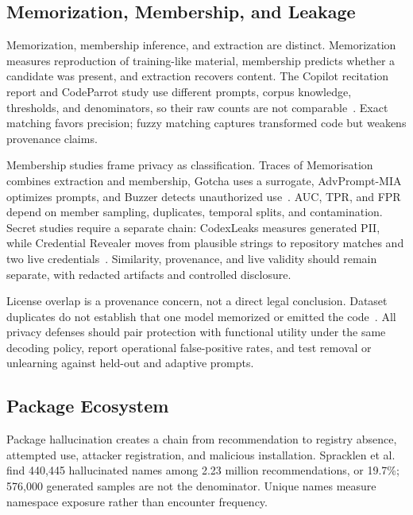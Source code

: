 \documentclass[acmsmall,screen,review]{acmart}
\begin{document}
\subsection{Memorization, Membership, and Leakage} \label{sec:gensec:privacy}
Memorization, membership inference, and extraction are distinct. Memorization measures reproduction of training-like material, membership predicts whether a candidate was present, and extraction recovers content. The Copilot recitation report and CodeParrot study use different prompts, corpus knowledge, thresholds, and denominators, so their raw counts are not comparable~\cite{ziegler2021recitation,yang2024unveiling}. Exact matching favors precision; fuzzy matching captures transformed code but weakens provenance claims.

Membership studies frame privacy as classification. Traces of Memorisation combines extraction and membership, Gotcha uses a surrogate, AdvPrompt-MIA optimizes prompts, and Buzzer detects unauthorized use~\cite{alkaswan2024traces,yang2024gotcha,advprompt2025mia,zhang2023buzzer}. AUC, TPR, and FPR depend on member sampling, duplicates, temporal splits, and contamination. Secret studies require a separate chain: CodexLeaks measures generated PII, while Credential Revealer moves from plausible strings to repository matches and two live credentials~\cite{niu2023codexleaks,huang2024secret}. Similarity, provenance, and live validity should remain separate, with redacted artifacts and controlled disclosure.

License overlap is a provenance concern, not a direct legal conclusion. Dataset duplicates do not establish that one model memorized or emitted the code~\cite{katzy2024license}. All privacy defenses should pair protection with functional utility under the same decoding policy, report operational false-positive rates, and test removal or unlearning against held-out and adaptive prompts.

\subsection{Package Ecosystem}
Package hallucination creates a chain from recommendation to registry absence, attempted use, attacker registration, and malicious installation. Spracklen et al.~\cite{spracklen2025package} find 440{,}445 hallucinated names among 2.23 million recommendations, or 19.7\%; 576{,}000 generated samples are not the denominator. Unique names measure namespace exposure rather than encounter frequency.
\end{document}
